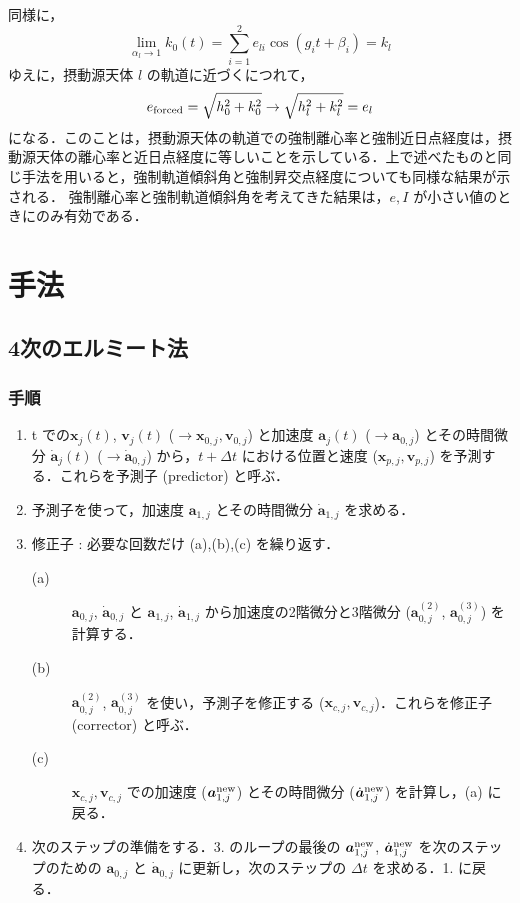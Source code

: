 \documentclass[11pt,a4paper,oneside,onecolumn]{jarticle}
\begin{document}
同様に，
\begin{equation}
\lim_{\alpha_l \rightarrow 1} k_0 (t) = \sum_{i = 1}^2 e_{li} \cos (g_i t + \beta_i) = k_l
\end{equation}
ゆえに，摂動源天体 $l$ の軌道に近づくにつれて，
\begin{equation}
e_{\rm forced} = \sqrt{h_0^2 + k_0^2} \rightarrow \sqrt{h_l^2 + k_l^2} = e_l 
\end{equation}
になる．このことは，摂動源天体の軌道での強制離心率と強制近日点経度は，摂動源天体の離心率と近日点経度に等しいことを示している．上で述べたものと同じ手法を用いると，強制軌道傾斜角と強制昇交点経度についても同様な結果が示される．
強制離心率と強制軌道傾斜角を考えてきた結果は，$e, I$ が小さい値のときにのみ有効である．









\section{手法}
\subsection{4次のエルミート法 \label{sec:Hermite}}
\subsubsection{手順}
\begin{enumerate}
\item t での${\bm x}_j (t)$, ${\bm v}_j (t)$ ($\to {\bm x}_{0,j} , {\bm v}_{0,j}$) と加速度 ${\bm a}_j (t)$ ($\to {\bm a}_{0,j}$) とその時間微分 $\dot{{\bm a}}_j (t)$ ($\to \dot{{\bm a}}_{0,j}$) から，$t + \Delta t$ における位置と速度 (${\bm x}_{p,j} , {\bm v}_{p,j}$) を予測する．これらを予測子 (predictor) と呼ぶ．
\item 予測子を使って，加速度 ${\bm a}_{1,j}$ とその時間微分 $\dot{{\bm a}}_{1,j}$ を求める．
\item 修正子 : 必要な回数だけ (a),(b),(c) を繰り返す．
\begin{description}
\item[(a)] ${\bm a}_{0,j}$, $\dot{{\bm a}}_{0,j}$ と ${\bm a}_{1,j}$, $\dot{{\bm a}}_{1,j}$ から加速度の2階微分と3階微分 (${\bm a}_{0,j}^{(2)}$, ${\bm a}_{0,j}^{(3)}$) を計算する．
\item[(b)] ${\bm a}_{0,j}^{(2)}$, ${\bm a}_{0,j}^{(3)}$ を使い，予測子を修正する (${\bm x}_{c,j} , {\bm v}_{c,j}$)．これらを修正子 (corrector) と呼ぶ．
\item[(c)] ${\bm x}_{c,j} , {\bm v}_{c,j}$ での加速度 (${\bm a}_{1,j}^{{\rm new}}$) とその時間微分 ($\dot{{\bm a}}_{1,j}^{{\rm new}}$) を計算し，(a) に戻る．
\end{description}
\item 次のステップの準備をする．3. のループの最後の ${\bm a}_{1,j}^{{\rm new}}$, $\dot{{\bm a}}_{1,j}^{{\rm new}}$ を次のステップのための ${\bm a}_{0,j}$ と $\dot{{\bm a}}_{0,j}$ に更新し，次のステップの $\Delta t$ を求める．1. に戻る．
\end{enumerate}
\end{document}
